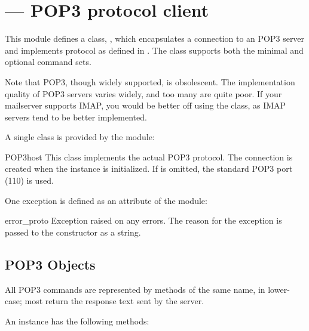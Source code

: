 \section{ ---
         POP3 protocol client}




This module defines a class, , which encapsulates a
connection to an POP3 server and implements protocol as defined in
.  The  class supports both the minimal and
optional command sets.

Note that POP3, though widely supported, is obsolescent.  The
implementation quality of POP3 servers varies widely, and too many are
quite poor. If your mailserver supports IMAP, you would be better off
using the  class, as IMAP servers tend to be better
implemented.

A single class is provided by the  module:

\begin{classdesc}{POP3}{host}
This class implements the actual POP3 protocol.  The connection is
created when the instance is initialized.
If  is omitted, the standard POP3 port (110) is used.
\end{classdesc}

One exception is defined as an attribute of the  module:

\begin{excdesc}{error_proto}
Exception raised on any errors.  The reason for the exception is
passed to the constructor as a string.
\end{excdesc}


\subsection{POP3 Objects \label{pop3-objects}}

All POP3 commands are represented by methods of the same name,
in lower-case; most return the response text sent by the server.

An  instance has the following methods:


